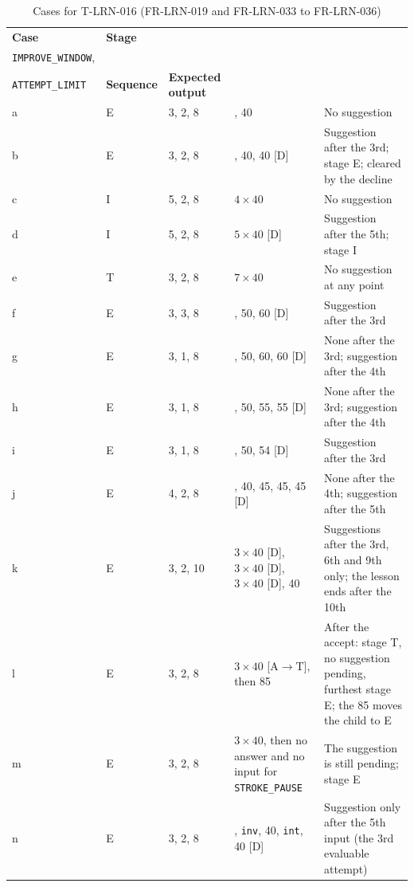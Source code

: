 \documentclass[12pt, titlepage]{article}
\begin{document}
\begin{enumerate}
\begin{table}[htbp]
\centering\footnotesize
\setlength{\tabcolsep}{4pt}
\caption{Cases for T-LRN-016 (FR-LRN-019 and FR-LRN-033 to FR-LRN-036)}
\label{tab:t-lrn-016}
\begin{tabularx}{\textwidth}{@{}l l l
  >{\raggedright\arraybackslash\hsize=0.8\hsize}X
  >{\raggedright\arraybackslash\hsize=1.2\hsize}X@{}}
\toprule
\textbf{Case} & \textbf{Stage} &
\begin{tabular}[b]{@{}l@{}}\texttt{DIFFICULTY\_STREAK},\\
\texttt{IMPROVE\_WINDOW},\\ \texttt{ATTEMPT\_LIMIT}\end{tabular} &
\textbf{Sequence} & \textbf{Expected output}\\
\midrule
a & E & 3, 2, 8 & 40, 40 & No suggestion\\
b & E & 3, 2, 8 & 40, 40, 40 [D] & Suggestion after the 3rd; stage E;
cleared by the decline\\
c & I & 5, 2, 8 & $4 \times 40$ & No suggestion\\
d & I & 5, 2, 8 & $5 \times 40$ [D] & Suggestion after the 5th; stage I\\
e & T & 3, 2, 8 & $7 \times 40$ & No suggestion at any point\\
f & E & 3, 3, 8 & 40, 50, 60 [D] & Suggestion after the 3rd\\
g & E & 3, 1, 8 & 40, 50, 60, 60 [D] & None after the 3rd; suggestion
after the 4th\\
h & E & 3, 1, 8 & 40, 50, 55, 55 [D] & None after the 3rd; suggestion
after the 4th\\
i & E & 3, 1, 8 & 40, 50, 54 [D] & Suggestion after the 3rd\\
j & E & 4, 2, 8 & 40, 40, 45, 45, 45 [D] & None after the 4th;
suggestion after the 5th\\
k & E & 3, 2, 10 & $3 \times 40$ [D], $3 \times 40$ [D], $3 \times 40$
[D], 40 & Suggestions after the 3rd, 6th and 9th only; the lesson ends
after the 10th\\
l & E & 3, 2, 8 & $3 \times 40$ [A$\to$T], then 85 & After the accept:
stage T, no suggestion pending, furthest stage E; the 85 moves the child
to E\\
m & E & 3, 2, 8 & $3 \times 40$, then no answer and no input for
\texttt{STROKE\_PAUSE} & The suggestion is still pending; stage E\\
n & E & 3, 2, 8 & 40, \texttt{inv}, 40, \texttt{int}, 40 [D] &
Suggestion only after the 5th input (the 3rd evaluable attempt)\\

\end{tabularx}
\end{table}
\end{enumerate}
\end{document}
